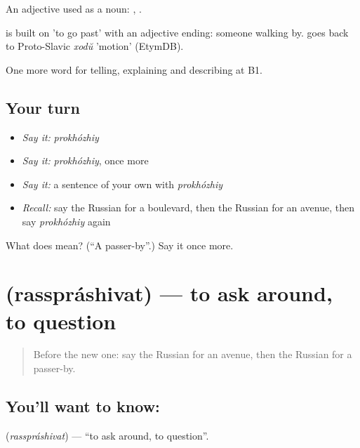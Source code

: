 An adjective used as a noun: \emph{}, \emph{}.

\begin{cousinweb}
\emph{} is built on \emph{} 'to go past' with an adjective ending: someone walking by. \emph{} goes back to Proto-Slavic \emph{xodŭ} 'motion' (EtymDB).
\end{cousinweb}

\begin{grammarlens}[title={What you've built}]
One more word for telling, explaining and describing at B1.
\end{grammarlens}

\subsection*{Your turn}
\begin{itemize}
\raggedright
  \item \emph{Say it:} \emph{prokhózhiy}
  \item \emph{Say it:} \emph{prokhózhiy}, once more
  \item \emph{Say it:} a sentence of your own with \emph{prokhózhiy}
  \item \emph{Recall:} say the Russian for a boulevard, then the Russian for an avenue, then say \emph{prokhózhiy} again
\end{itemize}

\begin{tcolorbox}[breakable,colback=teal!4,colframe=teal!35!black,title={Before you move on}]
What does  mean? (\textquotedblleft{}A passer-by\textquotedblright{}.) Say it once more.
\end{tcolorbox}
\section[\texorpdfstring{\ru{расспрашивать} (rasspráshivat)}{расспрашивать (rasspráshivat)}]{ (rasspráshivat) — to ask around, to question}

\label{lesson:RU-C441-rassprashivat}



\begin{quote}
Before the new one: say the Russian for an avenue, then the Russian for a passer-by.
\end{quote}

\subsection*{You'll want to know: }
\textbf{} (\emph{rasspráshivat}) — \textquotedblleft{}to ask around, to question\textquotedblright{}.

